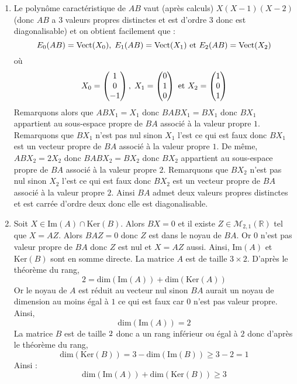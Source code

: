 \documentclass[a4paper,10pt]{report}
\begin{document}
\begin{enumerate}
\item Le polynôme caractéristique de $AB$ vaut (après calculs) $X(X-1)(X-2)$ (donc $AB$ a $3$ valeurs propres distinctes et est d'ordre $3$ donc est diagonalisable) et on obtient facilement que :
$$ E_{0}(AB) = \textrm{Vect}(X_0), \; E_{1}(AB) = \textrm{Vect}(X_1) \hbox{ et } E_{2}(AB) = \textrm{Vect}(X_2)$$
où 
$$ X_0 = \begin{pmatrix}
1 \\
0 \\
-1
\end{pmatrix},  \; X_1 = \begin{pmatrix}
0 \\
1 \\
0
\end{pmatrix} \hbox{ et } X_2 = \begin{pmatrix}
1 \\
0 \\
1
\end{pmatrix}$$
Remarquons alors que $ABX_1=X_1$ donc $BABX_1=BX_1$ donc $BX_1$ appartient au sous-espace propre de $BA$ associé à la valeur propre $1$. Remarquons que $BX_1$ n'est pas nul sinon $X_1$ l'est ce qui est faux donc $BX_1$ est un vecteur propre de $BA$ associé à la valeur propre $1$. De même, $ABX_2=2X_2$ donc $BABX_2=BX_2$ donc $BX_2$ appartient au sous-espace propre de $BA$ associé à la valeur propre $2$. Remarquons que $BX_2$ n'est pas nul sinon $X_2$ l'est ce qui est faux donc $BX_2$ est un vecteur propre de $BA$ associé à la valeur propre $2$.  Ainsi $BA$ admet deux valeurs propres distinctes et est carrée d'ordre deux donc elle est diagonalisable.
\item Soit $X \in \textrm{Im}(A) \cap \textrm{Ker}(B)$. Alors $BX=0$ et il existe $Z \in \mathcal{M}_{2,1}(\mathbb{R})$ tel que $X=AZ$. Alors $BAZ=0$ donc $Z$ est dans le noyau de $BA$. Or $0$ n'est pas valeur propre de $BA$ donc $Z$ est nul et $X=AZ$ aussi. Ainsi, $\textrm{Im}(A)$ et $\textrm{Ker}(B)$ sont en somme directe. La matrice $A$ est de taille $3 \times 2$. D'après le théorème du rang,
$$ 2 = \textrm{dim}(\textrm{Im}(A)) + \textrm{dim}(\textrm{Ker}(A))$$
Or le noyau de $A$ est réduit au vecteur nul sinon $BA$ aurait un noyau de dimension au moins égal à $1$ ce qui est faux car $0$ n'est pas valeur propre. Ainsi,
$$\textrm{dim}(\textrm{Im}(A))  = 2$$
La matrice $B$ est de taille $2 \time 3$ donc a un rang inférieur ou égal à $2$ donc d'après le théorème du rang,
$$ \textrm{dim}(\textrm{Ker}(B)) = 3- \textrm{dim}(\textrm{Im}(B)) \geq 3-2 = 1$$
Ainsi :
$$ \textrm{dim}(\textrm{Im}(A)) + \textrm{dim}(\textrm{Ker}(B)) \geq 3$$

\end{enumerate}
\end{document}
